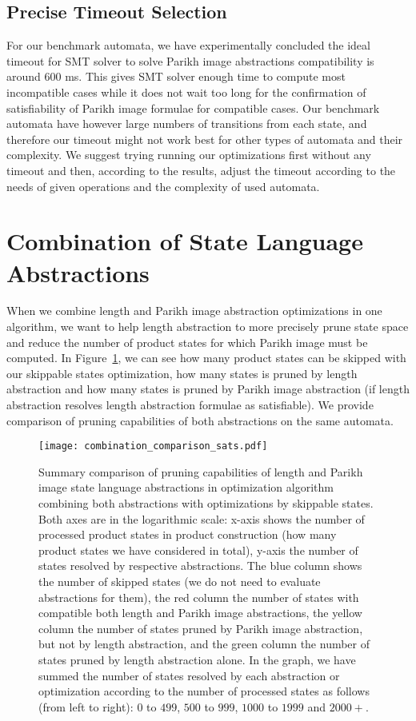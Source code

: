 \subsection{Precise Timeout Selection}

For our benchmark automata, we have experimentally concluded the ideal timeout for SMT solver to solve Parikh image abstractions compatibility is around $600$ ms. This gives SMT solver enough time to compute most incompatible cases while it does not wait too long for the confirmation of satisfiability of Parikh image formulae for compatible cases. Our benchmark automata have however large numbers of transitions from each state, and therefore our timeout might not work best for other types of automata and their complexity. We suggest trying running our optimizations first without any timeout and then, according to the results, adjust the timeout according to the needs of given operations and the complexity of used automata.

\section{Combination of State Language Abstractions}

When we combine length and Parikh image abstraction optimizations in one algorithm, we want to help length abstraction to more precisely prune state space and reduce the number of product states for which Parikh image must be computed. In Figure~\ref{fig:diagram:combined_sat_unsat_comparison}, we can see how many product states can be skipped with our skippable states optimization, how many states is pruned by length abstraction and how many states is pruned by Parikh image abstraction (if length abstraction resolves length abstraction formulae as satisfiable). We provide comparison of pruning capabilities of both abstractions on the same automata.

\begin{figure}[ht]
	\centering
	\texttt{[image: combination\_comparison\_sats.pdf]}
	\caption{Summary comparison of pruning capabilities of length and Parikh image state language abstractions in optimization algorithm combining both abstractions with optimizations by skippable states. Both axes are in the logarithmic scale: x-axis shows the number of processed product states in product construction (how many product states we have considered in total), y-axis the number of states resolved by respective abstractions. The blue column shows the number of skipped states (we do not need to evaluate abstractions for them), the red column the number of states with compatible both length and Parikh image abstractions, the yellow column the number of states pruned by Parikh image abstraction, but not by length abstraction, and the green column the number of states pruned by length abstraction alone. In the graph, we have summed the number of states resolved by each abstraction or optimization according to the number of processed states as follows (from left to right): $0$ to $499$, $500$ to $999$, $1000$ to $1999$ and $2000+$.}
	\label{fig:diagram:combined_sat_unsat_comparison}
\end{figure}

